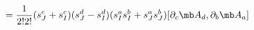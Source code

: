 \begin{equation}
[L_2^{(2)},L_1^{(2)}-L_3^{(2)}]= \frac{1}{2!2!}( s_{J}^{c}+ s_{I}^{c}) ( s_{J}^{d}- s_{I}^{d})  ( s_{I}^{a}s_{I}^{b}+s_{J}^{a} s_{J}^{b} )[ \partial_c{\mb A}_d,\partial_b{\mb A}_a]
\end{equation}

